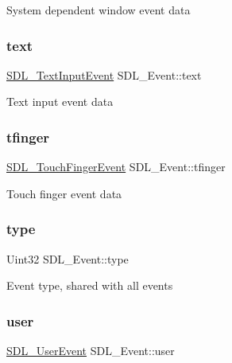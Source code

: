 System dependent window event data \mbox{\label{union_s_d_l___event_aa4fc65c559d69f33c057c0c23d8414b8}} 
\subsubsection{\texorpdfstring{text}{text}}
{\footnotesize\ttfamily \mbox{\hyperlink{struct_s_d_l___text_input_event}{S\+D\+L\+\_\+\+Text\+Input\+Event}} S\+D\+L\+\_\+\+Event\+::text}

Text input event data \mbox{\label{union_s_d_l___event_ab18d7d60794cb056948ffa58541bc3c5}} 
\subsubsection{\texorpdfstring{tfinger}{tfinger}}
{\footnotesize\ttfamily \mbox{\hyperlink{struct_s_d_l___touch_finger_event}{S\+D\+L\+\_\+\+Touch\+Finger\+Event}} S\+D\+L\+\_\+\+Event\+::tfinger}

Touch finger event data \mbox{\label{union_s_d_l___event_a237648bec242d2d5835f1a4250ddfa46}} 
\subsubsection{\texorpdfstring{type}{type}}
{\footnotesize\ttfamily Uint32 S\+D\+L\+\_\+\+Event\+::type}

Event type, shared with all events \mbox{\label{union_s_d_l___event_ab7c394e3ce7bf1e4f8d68bc0e9f1b042}} 
\subsubsection{\texorpdfstring{user}{user}}
{\footnotesize\ttfamily \mbox{\hyperlink{struct_s_d_l___user_event}{S\+D\+L\+\_\+\+User\+Event}} S\+D\+L\+\_\+\+Event\+::user}

